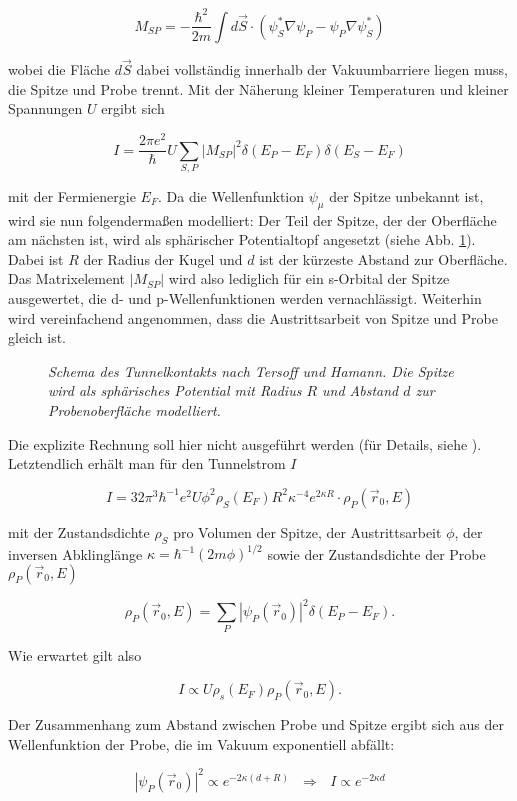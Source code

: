 \[M_{SP}=-\frac{\hbar^2}{2m}\int d\vec{S}\cdot(\psi_{S}^*\nabla\psi_{P} -
\psi_{P}\nabla\psi_{S}^*) \]

wobei die Fläche $d\vec{S}$ dabei vollständig innerhalb der Vakuumbarriere liegen muss, die
Spitze und Probe trennt. Mit der Näherung kleiner Temperaturen und kleiner Spannungen $U$ ergibt
sich

\[I=\frac{2\pi e^2}{\hbar}U\sum_{S,P}|M_{SP}|^2\delta(E_{P}-E_{F}) \delta(E_{S}-E_{F})\]

mit der Fermienergie $E_F$. Da die Wellenfunktion $\psi_{\mu}$ der Spitze unbekannt ist, wird sie
nun folgendermaßen modelliert: Der Teil der Spitze, der der Oberfläche am nächsten ist, wird als
sphärischer Potentialtopf angesetzt (siehe Abb. \ref{spitze}). Dabei ist $R$ der Radius der Kugel
und $d$ ist der kürzeste Abstand zur Oberfläche. Das Matrixelement $|M_{SP}|$ wird
also lediglich für ein s-Orbital der Spitze ausgewertet, die d- und p-Wellenfunktionen werden
vernachlässigt. Weiterhin wird vereinfachend angenommen, dass die Austrittsarbeit von Spitze und
Probe gleich ist.

\begin{figure}[H]
\centering
\sffamily 

\caption{\textit{Schema des Tunnelkontakts nach Tersoff und Hamann. Die Spitze wird als sphärisches
Potential mit Radius $R$ und Abstand $d$ zur Probenoberfläche modelliert.}}
\label{spitze}
\end{figure}
 
 Die explizite Rechnung soll hier nicht ausgeführt werden (für Details, siehe \cite{Ter83}).
 Letztendlich erhält man für den Tunnelstrom $I$
 
 \[I=32\pi^3\hbar^{-1}e^2U\phi^2\rho_{S}(E_F)R^2\kappa^{-4}e^{2\kappa
 R}\cdot\rho_P(\vec{r}_0, E)\]
 
 mit der Zustandsdichte $\rho_{S}$ pro Volumen der Spitze, der Austrittsarbeit $\phi$, der inversen
 Abklinglänge $\kappa=\hbar^{-1}(2m\phi)^{1/2}$ sowie der Zustandsdichte der Probe
 $\rho_P(\vec{r}_0, E)$
 
 \[\rho_P(\vec{r}_0, E)=\sum_{P}|\psi_{P}(\vec{r}_0)|^2\delta(E_{P}-E_F).\]
 
 Wie erwartet gilt also
 
 \[I\propto U \rho_{s}(E_F) \rho_P(\vec{r}_0, E).\]
 
 Der Zusammenhang zum Abstand zwischen Probe und Spitze ergibt sich aus der
 Wellenfunktion der Probe, die im Vakuum exponentiell abfällt:
 
 \[|\psi_P(\vec{r}_0)|^2\propto e^{-2\kappa(d+R)}~~~\Rightarrow~~~I\propto e^{-2\kappa d}\]
 
